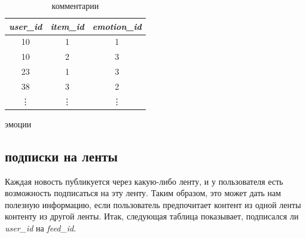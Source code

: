 \documentclass[14pt]{matmex-diploma-custom}
\begin{document}
\begin{table}[h]
    \parbox{.45\textwidth}{
        \centering
        \begin{tabular}{ccc}
            \toprule

            \emph{user\_id} & \emph{item\_id} & \emph{emotion\_id} \\\midrule
            10 & 1 & 1  \\
            10 & 2 & 3        \\
            23 & 1 & 3        \\
            38 & 3 & 2        \\
            \vdots & \vdots & \vdots  \\\bottomrule

        \end{tabular}
        \caption{эмоции}
        \label{tab:emotion}
    }
    \hfill
    \parbox{.45\textwidth}{
        \centering
        \caption{комментарии}
        \label{tab:comment}
        }
\end{table}   





\subsection*{подписки на ленты}

Каждая новость публикуется через какую-либо ленту, и у пользователя есть возможность подписаться на эту ленту. Таким образом, это может дать нам полезную информацию, если пользователь предпочитает контент из одной ленты контенту из другой ленты. Итак, следующая таблица показывает, подписался ли \emph {user\_id} на \emph{feed\_id}.
\end{document}
